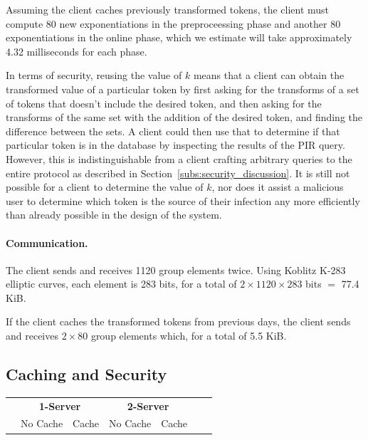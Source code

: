 {	Assuming the client caches previously transformed tokens, the client must compute 80 new exponentiations in the preproceessing phase and another 80 exponentiations in the online phase, which we estimate will take approximately 4.32 milliseconds for each phase.
	
	In terms of security, reusing the value of $k$ means that a client can obtain the transformed value of a particular token by first asking for the transforms of a set of tokens that doesn't include the desired token, and then asking for the transforms of the same set with the addition of the desired token, and finding the difference between the sets. A client could then use that to determine if that particular token is in the database by inspecting the results of the PIR query. However, this is indistinguishable from a client crafting arbitrary queries to the entire protocol as described in Section~\ref{subs:security_discussion}. It is still not possible for a client to determine the value of $k$, nor does it assist a malicious user to determine  which token is the source of their infection any more efficiently than already possible in the design of the system.
	
	\paragraph{Communication.} The client sends and receives 1120 group elements twice. Using Koblitz K-283 elliptic curves, each element is 283 bits, for a total of $2 \times 1120 \times 283$ bits $=$ 77.4 KiB.
	
	If the client caches the transformed tokens   from previous days, the client sends and receives $2\times 80$ group elements which, for a total of 5.5 KiB.
	
	\subsection{Caching and Security}

\begin{table}[]
	\centering
	\begin{tabular}{|l||r|r|r|r||r|r|r|r|r|r|}
		\hline
		& \multicolumn{4}{c||}{\textbf{1-Server}} & \multicolumn{4}{c|}{\textbf{2-Server}} \\
		& \multicolumn{2}{c|}{No Cache}
		& \multicolumn{2}{c||}{Cache}
		& \multicolumn{2}{c|}{No Cache }& \multicolumn{2}{c|}{ Cache} \\ 
		

\end{tabular}
\end{table}}
